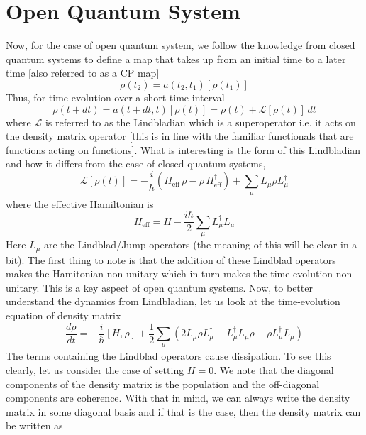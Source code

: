 \documentclass[aps,prb,onecolumn,notitlepage,showpacs,floatfix,superscriptaddress]{revtex4-1}
\newcommand{\mrm}[1]{\mathrm{#1}}
\begin{document}
\section{Open Quantum System}
Now, for the case of open quantum system, we follow the knowledge from closed quantum systems to define a map that takes up from an initial time to a later time [also referred to as a CP map]
\begin{equation}
\rho(t_2) = a(t_2,t_1) [\rho(t_1)]
\end{equation}
Thus, for time-evolution over a short time interval
\begin{equation}
\rho(t+dt) = a(t+dt,t) [\rho(t)] = \rho(t) + \mathcal{L} [\rho(t)] \, dt
\end{equation}
where $\mathcal{L}$ is referred to as the Lindbladian which is a superoperator i.e. it acts on the density matrix operator [this is in line with the familiar functionals that are functions acting on functions]. What is interesting is the form of this Lindbladian and how it differs from the case of closed quantum systems,
\begin{equation}
\mathcal{L} [\rho(t)] = - \dfrac{i}{\hbar} \left( H_\mrm{eff}\, \rho - \rho \, H_\mrm{eff}^\dagger  \right) + \sum_\mu L_\mu \rho L_\mu^\dagger
\end{equation}
where the effective Hamiltonian is
\begin{equation}
H_\mrm{eff} = H - \dfrac{i\hbar}{2} \sum_\mu L_\mu^\dagger L_\mu
\end{equation}
Here $L_\mu$ are the Lindblad/Jump operators (the meaning of this will be clear in a bit). The first thing to note is that the addition of these Lindblad operators makes the Hamitonian non-unitary which in turn makes the time-evolution non-unitary. This is a key aspect of open quantum systems. Now, to better understand the dynamics from Lindbladian, let us look at the time-evolution equation of density matrix
\begin{equation}
\dfrac{d\rho}{dt} = - \dfrac{i}{\hbar} [H,\rho] + \dfrac{1}{2} \sum_\mu \left( 2 L_\mu \rho L_\mu^\dagger - L_\mu^\dagger L_\mu \rho - \rho L_\mu^\dagger L_\mu  \right)
\end{equation}
The terms containing the Lindblad operators cause dissipation. To see this clearly, let us consider the case of setting $H=0$. We note that the diagonal components of the density matrix is the population and the off-diagonal components are coherence. With that in mind, we can always write the density matrix in some diagonal basis and if that is the case, then the density matrix can be written as
\end{document}
